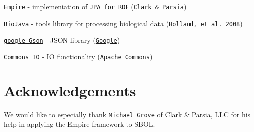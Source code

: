 \begin{DoxyItemize}
\item \href{http://github.com/clarkparsia/Empire}{\tt Empire} -\/ implementation of \href{http://semanticweb.com/empire-rdf-sparql-meet-jpa_b15617}{\tt JPA for RDF} (\href{http://clarkparsia.com/}{\tt Clark \& Parsia})
\item \href{http://biojava.org/wiki/Main_Page}{\tt BioJava} -\/ tools library for processing biological data (\href{http://dx.doi.org/10.1093/bioinformatics/btn397}{\tt Holland, et al. 2008})
\item \href{http://code.google.com/p/google-gson/}{\tt google-\/Gson} -\/ JSON library (\href{http://code.google.com/opensource/projects.html}{\tt Google})
\item \href{http://commons.apache.org/io/index.html}{\tt Commons IO} -\/ IO functionality (\href{http://commons.apache.org/}{\tt Apache Commons})
\end{DoxyItemize}\hypertarget{index_thanks_sec}{}\section{Acknowledgements}\label{index_thanks_sec}

\begin{DoxyItemize}
\item We would like to especially thank \href{https://github.com/clarkparsia}{\tt Michael Grove} of Clark \& Parsia, LLC for his help in applying the Empire framework to SBOL. 
\end{DoxyItemize}